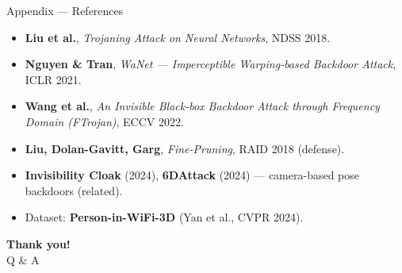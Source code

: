 \documentclass[aspectratio=169,10pt]{beamer}
\newcommand{\acc}[1]{\textcolor{accent}{\textbf{#1}}}
\begin{document}
\begin{frame}{Appendix --- References}
  \footnotesize
  \begin{itemize}
    \item \textbf{Liu et al.}, \emph{Trojaning Attack on Neural Networks}, NDSS 2018.
    \item \textbf{Nguyen \& Tran}, \emph{WaNet --- Imperceptible Warping-based Backdoor Attack}, ICLR 2021.
    \item \textbf{Wang et al.}, \emph{An Invisible Black-box Backdoor Attack through Frequency Domain (FTrojan)}, ECCV 2022.
    \item \textbf{Liu, Dolan-Gavitt, Garg}, \emph{Fine-Pruning}, RAID 2018 (defense).
    \item \textbf{Invisibility Cloak} (2024), \textbf{6DAttack} (2024) --- camera-based pose backdoors (related).
    \item Dataset: \textbf{Person-in-WiFi-3D} (Yan et al., CVPR 2024).
  \end{itemize}
\end{frame}

\begin{frame}[plain]
  \centering
  \vfill
  {\Huge \acc{Thank you!}}\\[1em]
  {\large Q \& A}
  \vfill
\end{frame}
\end{document}
